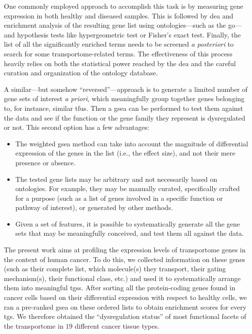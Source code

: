One commonly employed approach to accomplish this task is by measuring gene expression in both healthy and diseased samples.
This is followed by \gls{dea} and enrichment analysis of the resulting gene list using ontologies---such as the \gls{go}---and hypothesis tests like hypergeometric test or Fisher's exact test.
Finally, the list of all the significantly enriched terms needs to be screened \textit{a posteriori} to search for some transportome-related terms.
The effectiveness of this process heavily relies on both the statistical power reached by the \gls{dea} and the careful curation and organization of the ontology database.

A similar---but somehow ``reversed''---approach is to generate a limited number of gene sets of interest \textit{a priori}, which meaningfully group together genes belonging to, for instance, similar \glspl{tfu}.
Then a \gls{gsea} can be performed to test them against the data and see if the function or the gene family they represent is dysregulated or not.
This second option has a few advantages:
\begin{itemize}
    \item The weighted \gls{gsea} method can take into account the magnitude of differential expression of the genes in the list (i.e., the effect size), and not their mere presence or absence.
    \item The tested gene lists may be arbitrary and not necessarily based on ontologies.
    For example, they may be manually curated, specifically crafted for a purpose (such as a list of genes involved in a specific function or pathway of interest), or generated by other methods.
    \item Given a set of features, it is possible to systematically generate all the gene sets that may be meaningfully conceived, and test them all against the data.
\end{itemize}

The present work aims at profiling the expression levels of transportome genes in the context of human cancer.
To do this, we collected information on these genes (such as their complete list, which molecule(s) they transport, their gating mechanism(s), their functional class, etc.) and used it to systematically arrange them into meaningful \glspl{tgs}.
After sorting all the protein-coding genes found in cancer cells based on their differential expression with respect to healthy cells, we ran a pre-ranked \gls{gsea} on these ordered lists to obtain enrichment scores for every \gls{tgs}.
We therefore obtained the ``dysregulation status'' of most functional facets of the transportome in $19$ different cancer tissue types.

